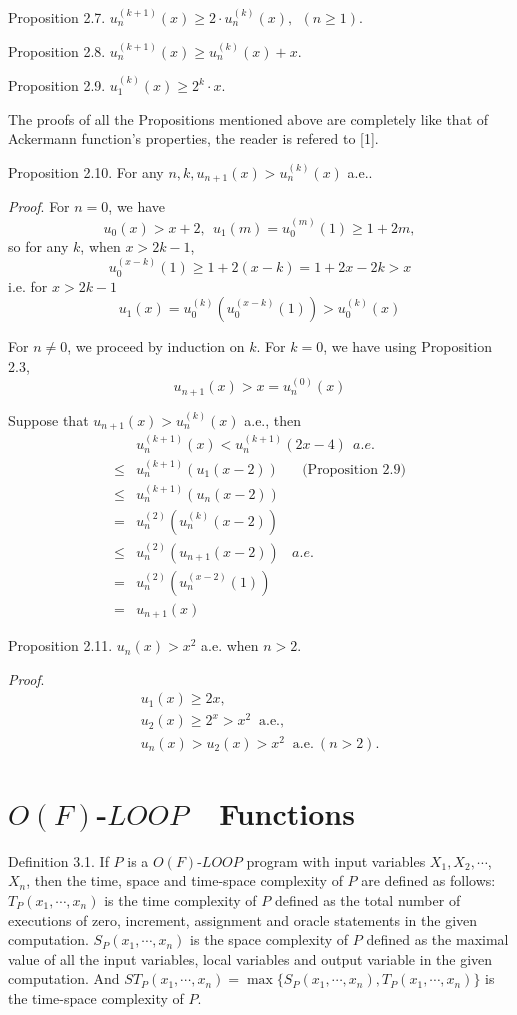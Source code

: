 Proposition 2.7. $u^{(k+1)}_n(x)\ge 2\cdot u^{(k)}_n(x),\ \ (n\ge 
1)$.

Proposition 2.8. $u^{(k+1)}_n(x)\ge u^{(k)}_n(x)+x$.

Proposition 2.9. $u^{(k)}_1(x)\ge 2^k\cdot x$.

The proofs of all the Propositions mentioned above are completely
like that of Ackermann function's properties, the reader is
refered to [1].

Proposition 2.10. For any $n,k,u_{n+1}(x)>u^{(k)}_n(x)$ a.e..

{\it Proof}. For $n=0$, we have
$$u_0(x)>x+2,\ \ u_1(m)=u^{(m)}_0(1)\ge 1+2m,$$
so for any $k$, when $x>2k-1$,
$$u^{(x-k)}_0(1)\ge 1+2(x-k)=1+2x-2k>x$$
i.e. for $x>2k-1$
$$u_1(x)=u^{(k)}_0(u^{(x-k)}_0(1))>u^{(k)}_0(x)$$

For $n\ne 0$, we proceed by induction on $k$.
For $k=0$, we have
using Proposition 2.3,
$$u_{n+1}(x)>x=u^{(0)}_n(x)$$

Suppose that $u_{n+1}(x)>u^{(k)}_n(x)$ a.e., then
$$\begin{array}{ll}  
&u^{(k+1)}_n(x)<u^{(k+1)}_n(2x-4)\ \ a.e.\\
\le &u^{(k+1)}_n(u_1(x-2))\ \ \ \ \ \ \mbox{ (Proposition 2.9)}\\
\le &u^{(k+1)}_n(u_n(x-2))\\
= &u^{(2)}_n(u^{(k)}_n(x-2))\\
\le &u^{(2)}_n(u_{n+1}(x-2))\ \ \ \ a.e.\\
=&u^{(2)}_n(u^{(x-2)}_n(1))\\
=&u_{n+1}(x)\end{array}$$


Proposition 2.11. $u_n(x)>x^2$ a.e. when $n>2$.

{\it Proof}. $$\begin{array}{l}  
u_1(x)\ge 2x,\\
u_2(x)\ge 2^x>x^2\ \mbox{ a.e.},\\
u_n(x)>u_2(x)>x^2\ \mbox{ a.e.}\ (n>2).\end{array}$$

\section{$O(F)$-$LOOP$\ \ Functions}

Definition 3.1. If $P$ is a $O(F)$-$LOOP$ program with input
variables $X_1,X_2,\cdots$, $X_n$, then the time, space and time-space
complexity of $P$ are defined as follows:
$T_P(x_1,\cdots,x_n)$ is the time complexity of $P$ defined as 
the total number of executions of zero, increment, assignment and 
oracle statements in the given computation. $S_P(x_1,\cdots,x_n)$ 
is the space complexity of $P$ defined as the maximal value of  
all the input variables, local variables and output variable in 
the given computation. And 
$ST_P(x_1,\cdots,x_n)=\max\{S_P(x_1,\cdots,x_n),T_P(x_1,\cdots,x_n)\}$ 
is the time-space complexity of $P$.


